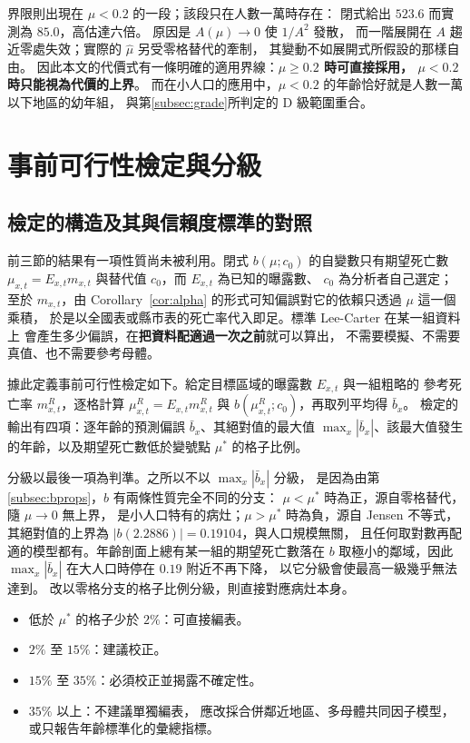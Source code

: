 \documentclass[UTF8, fontset=macnew, a4paper, 12pt]{ctexart}
\begin{document}
界限則出現在 $\mu<0.2$ 的一段；該段只在人數一萬時存在：
閉式給出 $523.6$ 而實測為 $85.0$，高估達六倍。
原因是 $A(\mu)\to0$ 使 $1/A^2$ 發散，
而一階展開在 $A$ 趨近零處失效；實際的 $\hat\mu$ 另受零格替代的牽制，
其變動不如展開式所假設的那樣自由。
因此本文的代價式有一條明確的適用界線：\textbf{$\mu\ge0.2$ 時可直接採用，
$\mu<0.2$ 時只能視為代價的上界}。
而在小人口的應用中，$\mu<0.2$ 的年齡恰好就是人數一萬以下地區的幼年組，
與第\ref{subsec:grade}所判定的 D 級範圍重合。

\section{事前可行性檢定與分級}\label{sec:feas}

\subsection{檢定的構造及其與信賴度標準的對照}\label{subsec:feasconstr}\label{subsec:cred2}

前三節的結果有一項性質尚未被利用。閉式 $b(\mu;c_0)$ 的自變數只有期望死亡數
$\mu_{x,t}=E_{x,t}m_{x,t}$ 與替代值 $c_0$，而 $E_{x,t}$ 為已知的曝露數、
$c_0$ 為分析者自己選定；至於 $m_{x,t}$，由 Corollary~\ref{cor:alpha}
的形式可知偏誤對它的依賴只透過 $\mu$ 這一個乘積，
於是以全國表或縣市表的死亡率代入即足。標準 Lee-Carter 在某一組資料上
會產生多少偏誤，在\textbf{把資料配適過一次之前}就可以算出，
不需要模擬、不需要真值、也不需要參考母體。

據此定義事前可行性檢定如下。給定目標區域的曝露數 $E_{x,t}$ 與一組粗略的
參考死亡率 $m^{R}_{x,t}$，逐格計算 $\mu^{R}_{x,t}=E_{x,t}m^{R}_{x,t}$ 與
$b(\mu^{R}_{x,t};c_0)$，再取列平均得 $\bar b_x$。
檢定的輸出有四項：逐年齡的預測偏誤 $\bar b_x$、其絕對值的最大值
$\max_x|\bar b_x|$、該最大值發生的年齡，以及期望死亡數低於變號點
$\mu^{\ast}$ 的格子比例。

分級以最後一項為判準。之所以不以 $\max_x|\bar b_x|$ 分級，
是因為由第\ref{subsec:bprops}，$b$ 有兩條性質完全不同的分支：
$\mu<\mu^{\ast}$ 時為正，源自零格替代，隨 $\mu\to0$ 無上界，
是小人口特有的病灶；$\mu>\mu^{\ast}$ 時為負，源自 Jensen 不等式，
其絕對值的上界為 $|b(2.2886)|=0.19104$，與人口規模無關，
且任何取對數再配適的模型都有。年齡剖面上總有某一組的期望死亡數落在
$b$ 取極小的鄰域，因此 $\max_x|\bar b_x|$ 在大人口時停在 $0.19$ 附近不再下降，
以它分級會使最高一級幾乎無法達到。
改以零格分支的格子比例分級，則直接對應病灶本身。

\begin{itemize}[leftmargin=2.4em]
  \item[\textbf{A}] 低於 $\mu^{\ast}$ 的格子少於 $2\%$：可直接編表。
  \item[\textbf{B}] $2\%$ 至 $15\%$：建議校正。
  \item[\textbf{C}] $15\%$ 至 $35\%$：必須校正並揭露不確定性。
  \item[\textbf{D}] $35\%$ 以上：不建議單獨編表，
        應改採合併鄰近地區、多母體共同因子模型，或只報告年齡標準化的彙總指標。
\end{itemize}
\end{document}
